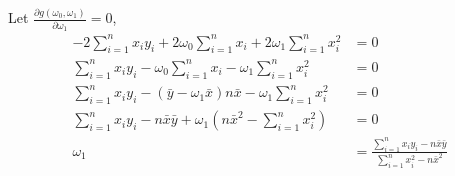 \documentclass[11pt]{article}
\theoremstyle{quest}
\begin{document}
Let $\frac{\partial g(\omega_0, \omega_1)}{\partial \omega_1} = 0$,
\begin{align*}
-2 \sum_{i=1}^{n}x_{i}y_{i} + 2\omega_{0}\sum_{i=1}^{n}x_{i} + 2\omega_{1}\sum_{i=1}^{n}x_{i}^{2} &= 0\\
\sum_{i=1}^{n}x_{i}y_{i} - \omega_{0}\sum_{i=1}^{n}x_{i} - \omega_{1}\sum_{i=1}^{n}x_{i}^{2} &= 0\\
\sum_{i=1}^{n}x_{i}y_{i} - (\bar{y} - \omega_{1}\bar{x})n\bar{x} - \omega_{1}\sum_{i=1}^{n}x_{i}^{2} &= 0 \\
\sum_{i=1}^{n}x_{i}y_{i} - n\bar{x}\bar{y} + \omega_{1}(n\bar{x}^2 - \sum_{i=1}^{n}x_{i}^{2}) &= 0\\
\omega_{1} &= \frac{\sum_{i=1}^{n}x_{i}y_{i} - n\bar{x}\bar{y}}{\sum_{i=1}^{n}x_{i}^{2} - n\bar{x}^2}
\end{align*}
\end{document}
